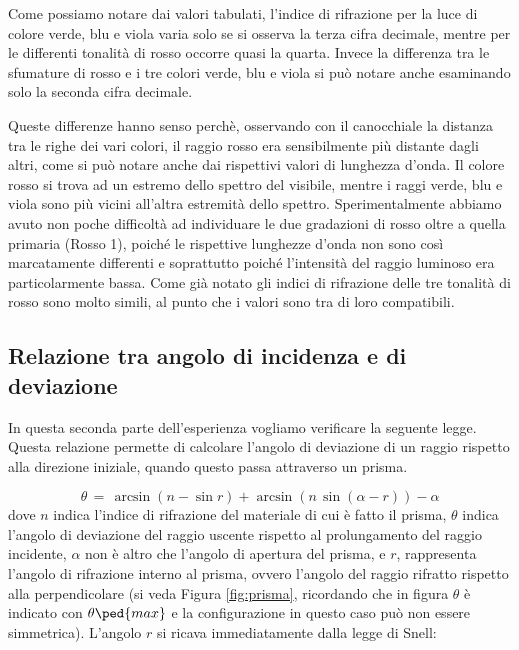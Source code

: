 Come possiamo notare dai valori tabulati, l'indice di rifrazione per la luce di colore verde, blu e viola varia solo se si osserva la terza cifra decimale, mentre per le differenti tonalità di rosso occorre quasi la quarta. Invece la differenza tra le sfumature di rosso e i tre colori verde, blu e viola si può notare anche esaminando solo la seconda cifra decimale.

Queste differenze hanno senso perchè, osservando con il canocchiale la distanza tra le righe dei vari colori, il raggio rosso era sensibilmente più distante dagli altri, come si può notare anche dai rispettivi valori di lunghezza d'onda. Il colore rosso si trova ad un estremo dello spettro del visibile, mentre i raggi verde, blu e viola sono più vicini all'altra estremità dello spettro. Sperimentalmente abbiamo avuto non poche difficoltà ad individuare le due gradazioni di rosso oltre a quella primaria (Rosso 1), poiché le rispettive lunghezze d'onda non sono così marcatamente differenti e soprattutto poiché l'intensità del raggio luminoso era particolarmente bassa.
Come già notato gli indici di rifrazione delle tre tonalità di rosso sono molto simili, al punto che i valori sono tra di loro compatibili.

\subsection{Relazione tra angolo di incidenza e di deviazione}

In questa seconda parte dell'esperienza vogliamo verificare la seguente legge. Questa relazione permette di calcolare l'angolo di deviazione di un raggio rispetto alla direzione iniziale, quando questo passa attraverso un prisma.

\begin{equation}
	\theta \,=\, \arcsin{(n - \sin{r})} + \arcsin{(n \, \sin{(\alpha - r)})} - \alpha
	\label{eq:brutta}
\end{equation}
%
dove $n$ indica l'indice di rifrazione del materiale di cui è fatto il prisma, $\theta$ indica l'angolo di deviazione del raggio uscente rispetto al prolungamento del raggio incidente, $\alpha$ non è altro che l'angolo di apertura del prisma, e $r$, rappresenta l'angolo di rifrazione interno al prisma, ovvero l'angolo del raggio rifratto rispetto alla perpendicolare (si veda Figura \ref{fig:prisma}, ricordando che in figura $\theta$ è indicato con $\theta\ped{max}$ e la configurazione in questo caso può non essere simmetrica). L'angolo $r$ si ricava immediatamente dalla legge di Snell:

